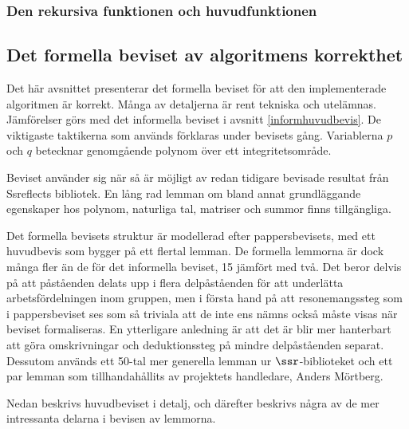 \subsubsection{Den rekursiva funktionen och huvudfunktionen}
\label{section:formrec}
\subsection{Det formella beviset av algoritmens korrekthet}
Det här avsnittet presenterar det formella beviset för att den implementerade algoritmen är korrekt. Många av 
detaljerna är rent tekniska och utelämnas. Jämförelser görs med det informella beviset i avsnitt 
\ref{informhuvudbevis}. De viktigaste taktikerna som används förklaras under 
bevisets gång. Variablerna $p$ och $q$ betecknar genomgående polynom över ett integritetsområde. 

Beviset använder sig när så är möjligt av redan tidigare bevisade resultat från Ssreflects bibliotek.
En lång rad lemman om bland annat grundläggande egenskaper hos polynom, naturliga tal, matriser och summor 
finns tillgängliga. 

Det formella bevisets struktur är modellerad efter 
pappersbevisets, med ett huvudbevis som bygger på ett flertal lemman. De formella lemmorna är dock 
många fler än de för det informella beviset, 15 jämfört med två. Det beror delvis på att påståenden delats upp 
i flera delpåståenden för att underlätta arbetsfördelningen inom gruppen, men i första hand på att resonemangssteg 
som i pappersbeviset ses som så triviala att de inte ens nämns också måste visas när beviset formaliseras. 
En ytterligare anledning är att det är blir mer hanterbart att göra omskrivningar och deduktionssteg på 
mindre delpåståenden separat.
Dessutom används ett 50-tal mer generella lemman ur $\ssr$-biblioteket och ett par lemman som 
tillhandahållits av projektets handledare, Anders Mörtberg. 

Nedan beskrivs huvudbeviset i detalj, och därefter beskrivs några av de mer intressanta delarna i 
bevisen av lemmorna.
 
